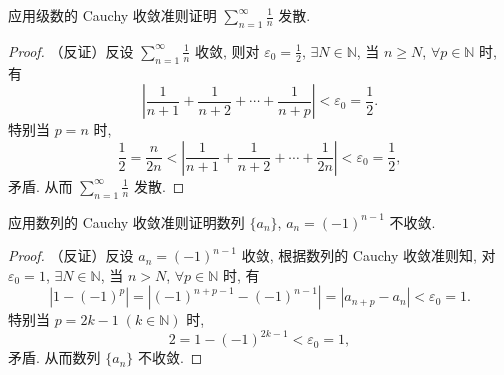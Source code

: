 \begin{example}\label{ex:1.4.16}
应用级数的 Cauchy 收敛准则证明 $\sum\limits_{n=1}^{\infty} \frac{1}{n}$ 发散.
\end{example}

\begin{proof}
（反证）反设 $\sum\limits_{n=1}^{\infty}\frac{1}{n}$ 收敛, 则对 $\varepsilon_{0} = \frac{1}{2}$, $\exists N\in\mathbb{N}$, 当 $n\geqslant N$, $\forall p\in\mathbb{N}$ 时, 有
\[
\left|\frac{1}{n+1} + \frac{1}{n+2} + \cdots + \frac{1}{n+p}\right| < \varepsilon_{0} = \frac{1}{2}.
\]
特别当 $p = n$ 时,
\[
\frac{1}{2} = \frac{n}{2n} < \left|\frac{1}{n+1} + \frac{1}{n+2} + \cdots + \frac{1}{2n}\right| < \varepsilon_{0} = \frac{1}{2},
\]
矛盾. 从而 $\sum\limits_{n=1}^{\infty} \frac{1}{n}$ 发散.
\end{proof}

\begin{example}\label{ex:1.4.17}
应用数列的 Cauchy 收敛准则证明数列 $\{a_{n}\}$, $a_{n} = (-1)^{n-1}$ 不收敛.
\end{example}

\begin{proof}
（反证）反设 $a_{n} = (-1)^{n-1}$ 收敛, 根据数列的 Cauchy 收敛准则知, 对 $\varepsilon_{0} = 1$, $\exists N\in\mathbb{N}$, 当 $n>N$, $\forall p\in\mathbb{N}$ 时, 有
\[
|1 - (-1)^{p}| = \left|(-1)^{n+p-1} - (-1)^{n-1}\right| = |a_{n+p} - a_{n}| < \varepsilon_{0} = 1.
\]
特别当 $p = 2k - 1\;(k \in \mathbb{N})$ 时,
\[
2 = 1 - (-1)^{2k-1} < \varepsilon_{0} = 1,
\]
矛盾. 从而数列 $\{a_{n}\}$ 不收敛.
\end{proof}


